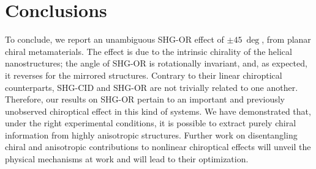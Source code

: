 \section{Conclusions}\label{sec:results:OAinPlanarNanohelices:conclusions}
To conclude, we report an unambiguous SHG-OR effect of $\pm \SI{45}{\deg}$, from planar chiral metamaterials. The effect is due to the intrinsic chirality of the helical nanostructures; the angle of SHG-OR is rotationally invariant, and, as expected, it reverses for the mirrored structures. Contrary to their linear chiroptical counterparts, SHG-CID and SHG-OR are not trivially related to one another. Therefore, our results on SHG-OR pertain to an important and previously unobserved chiroptical effect in this kind of systems. We have demonstrated that, under the right experimental conditions, it is possible to extract purely chiral information from highly anisotropic structures. Further work on disentangling chiral and anisotropic contributions to nonlinear chiroptical effects will unveil the physical mechanisms at work and will lead to their optimization. 